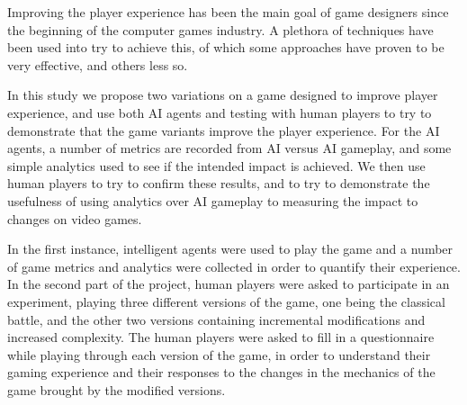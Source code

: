 Improving the player experience has been the main goal of game designers since the beginning of the computer games industry. A plethora of techniques have been used into try to achieve this, of which some approaches  have proven to be very effective, and others less so.

In this study we propose two variations on a game designed to improve player experience, and use both AI agents and testing with human players to try to demonstrate that the game variants improve the player experience. For the AI agents, a number of metrics are recorded from AI versus AI gameplay, and some simple analytics used to see if the intended impact is achieved. We then use human players to try to confirm these results, and to try to demonstrate the usefulness of using analytics over AI gameplay to measuring the impact to changes on video games.

In the first instance, intelligent agents were used to play the game and a number of game metrics and analytics were collected in order to quantify their experience. In the second part of the project, human players were asked to participate in an experiment, playing three different versions of the game, one being the classical battle, and the other two versions containing incremental modifications and increased complexity. The human players were asked to fill in a questionnaire while playing through each version of the game, in order to understand their gaming experience and their responses to the changes in the mechanics of the game brought by the modified versions.
